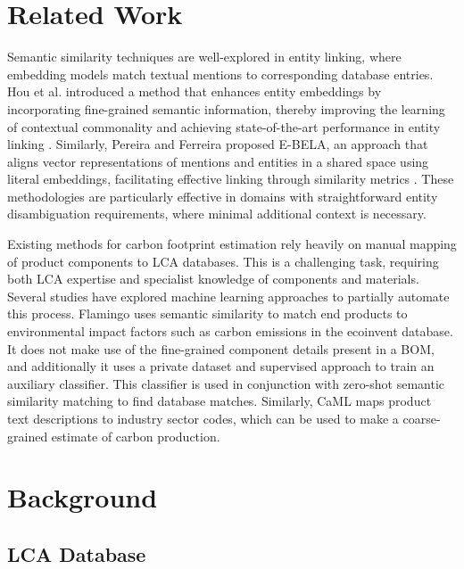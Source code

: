 \documentclass[11pt]{article}
\begin{document}
\section{Related Work}

Semantic similarity techniques are well-explored in entity linking, where embedding models match textual mentions to corresponding database entries. Hou et al. introduced a method that enhances entity embeddings by incorporating fine-grained semantic information, thereby improving the learning of contextual commonality and achieving state-of-the-art performance in entity linking \cite{hou2020improving}. Similarly, Pereira and Ferreira proposed E-BELA, an approach that aligns vector representations of mentions and entities in a shared space using literal embeddings, facilitating effective linking through similarity metrics \cite{pereira2024ebela}. These methodologies are particularly effective in domains with straightforward entity disambiguation requirements, where minimal additional context is necessary. 

Existing methods for carbon footprint estimation rely heavily on manual mapping of product components to LCA databases. This is a challenging task, requiring both LCA expertise and specialist knowledge of components and materials. Several studies have explored machine learning approaches to partially automate this process. Flamingo \cite{balaji2023flamingo} uses semantic similarity to match end products to environmental impact factors such as carbon emissions in the ecoinvent database. It does not make use of the fine-grained component details present in a BOM, and additionally it uses a private dataset and supervised approach to train an auxiliary classifier. This classifier is used in conjunction with zero-shot semantic similarity matching to find database matches. Similarly, CaML \cite{balaji2023caml} maps product text descriptions to industry sector codes, which can be used to make a coarse-grained estimate of carbon production. 

\section{Background}
\subsection{LCA Database}
\end{document}
